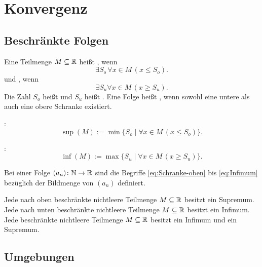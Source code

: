 \section{Konvergenz}
\subsection{Beschränkte Folgen}
\begin{definition}\mbox{}\newline
Eine Teilmenge $M\subseteq\mathbb R$ heißt ,
wenn
\begin{equation}\label{eq:Schranke-oben}
\exists S_o\,\forall x{\in}M\,(x\le S_o).
\end{equation}
und , wenn
\begin{equation}
\exists S_u\forall x{\in M}\,(x\ge S_u).
\end{equation}
Die Zahl $S_o$ heißt 
und $S_u$ heißt . Eine Folge heißt
, wenn sowohl eine untere als auch
eine obere Schranke existiert.
\end{definition}

\begin{definition}\mbox{}\newline
{}:
\begin{equation}
\sup(M) := \min\{S_o\mid \forall x{\in}M\,(x\le S_o)\}.
\end{equation}

:
\begin{equation}\label{eq:Infimum}
\inf(M) := \max\{S_u\mid \forall x{\in}M\,(x\ge S_u)\}.
\end{equation}
\end{definition}

\begin{definition}\mbox{}\newline
Bei einer Folge $(a_n)\colon\mathbb N\to\mathbb R$ sind die
Begriffe \eqref{eq:Schranke-oben}
bis \eqref{eq:Infimum} bezüglich der Bildmenge
von $(a_n)$ definiert.
\end{definition}

\noindent
Jede nach oben beschränkte nichtleere Teilmenge $M\subseteq\mathbb R$
besitzt ein Supremum.
Jede nach unten beschränkte nichtleere Teilmenge $M\subseteq\mathbb R$
besitzt ein Infimum.
Jede beschränkte nichtleere Teilmenge $M\subseteq\mathbb R$
besitzt ein Infimum und ein Supremum.

\subsection{Umgebungen}

